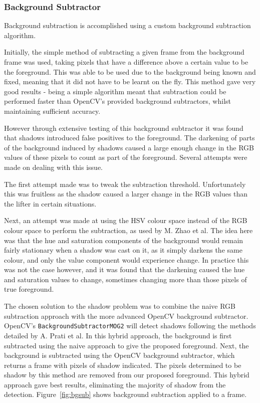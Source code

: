 \subsubsection{Background Subtractor}
\label{subsec:bgsub}

Background subtraction is accomplished using a custom background subtraction algorithm.

Initially, the simple method of subtracting a given frame from the background frame was used, taking pixels that have a difference above a certain value to be the foreground. This was able to be used due to the background being known and fixed, meaning that it did not have to be learnt on the fly. This method gave very good results - being a simple algorithm meant that subtraction could be performed faster than OpenCV's provided background subtractors, whilst maintaining sufficient accuracy.

However through extensive testing of this background subtractor it was found that shadows introduced false positives to the foreground. The darkening of parts of the background induced by shadows caused a large enough change in the RGB values of these pixels to count as part of the foreground. Several attempts were made on dealing with this issue.

The first attempt made was to tweak the subtraction threshold. Unfortunately this was fruitless as the shadow caused a larger change in the RGB values than the lifter in certain situations.

Next, an attempt was made at using the HSV colour space instead of the RGB colour space to perform the subtraction, as used by M. Zhao et al\cite{bgsubhsv}. The idea here was that the hue and saturation components of the background would remain fairly stationary when a shadow was cast on it, as it simply darkens the same colour, and only the value component would experience change. In practice this was not the case however, and it was found that the darkening caused the hue and saturation values to change, sometimes changing more than those pixels of true foreground.

The chosen solution to the shadow problem was to combine the naive RGB subtraction approach with the more advanced OpenCV background subtractor. OpenCV's \texttt{Background\allowbreak SubtractorMOG2} will detect shadows following the methods detailed by A. Prati et al\cite{bgsubmog2}. In this hybrid approach, the background is first subtracted using the naive approach to give the proposed foreground. Next, the background is subtracted using the OpenCV background subtractor, which returns a frame with pixels of shadow indicated. The pixels determined to be shadow by this method are removed from our proposed foreground. This hybrid approach gave best results, eliminating the majority of shadow from the detection. Figure~\ref{fig:bgsub} shows background subtraction applied to a frame.

